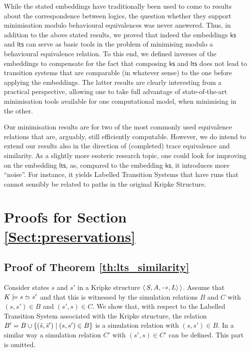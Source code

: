 \documentclass{llncs}
\newcommand{\kstrans}{\to}
\newcommand{\lts}{\mathsf{lts}}
\newcommand{\ks}{\mathsf{ks}}
\begin{document}
While the stated embeddings have traditionally been used to come to
results about the correspondence between logics, the question whether
they support minimisation modulo behavioural equivalences was never
answered. Thus, in addition to the above stated results, we proved that
indeed the embeddings $\ks$ and $\lts$ can serve as basic tools in the
problem of minimising modulo a behavioural equivalence relation. To this
end, we defined inverses of the embeddings to compensate for the fact that
composing $\ks$ and $\lts$ does not lead to transition systems that are
comparable (in whatever sense) to the one before applying the embeddings.
The latter results are clearly interesting from a practical perspective,
allowing one to take full advantage of state-of-the-art minimisation
tools available for one computational model, when minimising in the other.

Our minimisation results are for two of the most commonly used equivalence
relations that are, arguably, still efficiently computable. However,
we do intend to extend our results also in the direction of (completed)
trace equivalence and similarity. As a slightly more esoteric research
topic, one could look for improving on the embedding $\lts$, as, compared
to the embedding $\ks$, it introduces more ``noise''. For instance, it
yields Labelled Transition Systems that have runs that cannot sensibly
be related to paths in the original Kripke Structure.





\cleardoublepage
\appendix
\section{Proofs for Section \ref{Sect:preservations}}

\subsection{Proof of Theorem \ref{th:lts_similarity}}
\label{pf:th:lts_similarity}

Consider states $s$ and $s'$ in a Kripke structure $\tuple{S,A,\kstrans,L\rangle}$. Assume that $K \models s \simeq s'$ and that this is witnessed by the simulation relations $B$ and $C$ with $(s,s') \in B$ and $(s',s) \in C$.
We show that, with respect to the Labelled Transition System associated with the Kripke structure, the relation $B' = B \cup \{ (\bar{s},\bar{s}') \mid (s,s') \in B \}$ is a simulation relation with  $(s, s') \in B$. In a similar way a simulation relation $C'$ with $(s',s) \in C'$ can be defined. This part is omitted.
\end{document}
